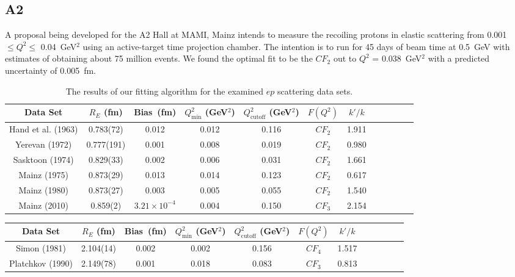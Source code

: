 \documentclass[aps,prd,twocolumn,groupedaddress,10pt]{revtex4-1}
\begin{document}
\subsection{A2}
A proposal being developed for the A2 Hall at MAMI, Mainz intends to measure the recoiling protons in elastic scattering from 0.001 $\leq Q^2 \leq$ 0.04~GeV$^2$ using an active-target time projection chamber. The intention is to run for 45 days of beam time at 0.5~GeV with estimates of obtaining about 75 million events. We found the optimal fit to be the ${CF}_{2}$ out to $Q^2$ = 0.038~GeV$^2$ with a predicted uncertainty of 0.005~fm. 

\begin{widetext}\begin{center}
\begin{table}
		\begin{tabular}{|c |c| c| c| c| c| c| c| c| c| c| c|} 
			\hline
			Data Set & $R_E$ (fm) & Bias~(fm) & $Q^2_\text{min}$ (GeV$^2$) & $Q^2_\text{cutoff}$ (GeV$^2$) & $F(Q^2)$  & $k'/k$ \\ 
			\hline
			Hand et al.  (1963) & 0.783(72) & 0.012 & 0.012 & 0.116 & ${CF}_{2}$  & 1.911 \\
			\hline
			Yerevan (1972) & 0.777(191) & 0.001 & 0.008  & 0.019 &${CF}_2$ & 0.980 \\
			\hline
			Sasktoon (1974) & 0.829(33) & 0.002 & 0.006 & 0.031 & ${CF}_2$ & 1.661 \\ 
			\hline
			Mainz (1975) & 0.873(29) & 0.013 & 0.014 & 0.123 & ${CF}_2$ & 0.617 \\
			\hline
			Mainz (1980) &0.873(27) & 0.003 & 0.005 & 0.055 & ${CF}_2$ & 1.540  \\
			\hline
			Mainz (2010) &0.859(2) & $3.21 \times 10^{-4}$ & 0.004 & 0.150 & ${CF}_3$ &  2.154 \\			
			\hline
		\end{tabular}
		\caption{The results of our fitting algorithm for the examined $ep$ scattering data sets.}
		\label{proton_table}
	\end{table}
\begin{table}
	\begin{tabular}{|c |c| c| c| c| c| c| c| c| c| c| c|} 
		\hline
		Data Set & $R_E$ (fm) & Bias~(fm) &  $Q^2_\text{min}$ (GeV$^2$) & $Q^2_\text{cutoff}$ (GeV$^2$)  & $F(Q^2)$   & $k'/k$ \\ 
		\hline
		Simon (1981) & 2.104(14) & 0.002 & 0.002 & 0.156 & ${CF}_4$  & 1.517 \\
		\hline
		Platchkov (1990) & 2.149(78) & 0.001 & 0.018  & 0.083 & ${CF}_3$ & 0.813 \\		

\end{tabular}
\end{table}
\end{center}
\end{widetext}
\end{document}
